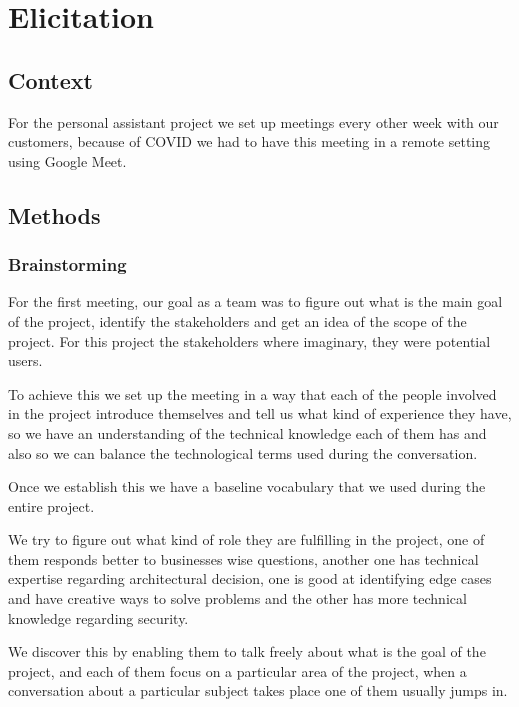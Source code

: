 \section{Elicitation}
\subsection{Context}
For the personal assistant project we set up meetings every other week with 
our customers, because of COVID we had to have this meeting in a remote 
setting using Google Meet.

\subsection{Methods}
\subsubsection{Brainstorming}
For the first meeting, our goal as a team was to figure out what is the main 
goal of the project, identify the stakeholders and get an idea of the scope of 
the project. For this project the stakeholders where imaginary, they were 
potential users.  \newline

\noindent To achieve this we set up the meeting in a way that each of the 
people involved in the project introduce themselves and tell us what kind of 
experience they have, so we have an understanding of the technical knowledge 
each of them has and also so we can balance the technological terms used 
during the conversation. \begin{flushleft} Once we establish this we have a baseline vocabulary that we used 
during the entire project.\end{flushleft} 

\noindent We try to figure out what kind of role they are fulfilling in the 
project, one of them responds better to businesses wise questions, another one 
has technical expertise regarding architectural decision, one is good at 
identifying edge cases and have creative ways to solve problems and the other 
has more technical knowledge regarding security. \newline

\noindent We discover this by enabling them to talk freely about what is the 
goal of the project, and each of them focus on a particular area of the 
project, when a conversation about a particular subject takes place one of 
them usually jumps in. \newline

